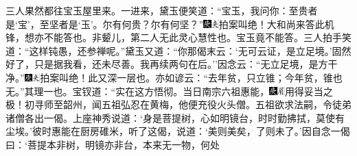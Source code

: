 三人果然都往宝玉屋里来。一进来，黛玉便笑道：``宝玉，我问你：至贵者是`宝'，至坚者是`玉'。尔有何贵？尔有何坚？''{\includegraphics[width=3mm]{../Images/00004}\includegraphics[width=3mm]{../Images/00012}\footnotesize \kaishu 拍案叫绝！大和尚来答此机锋，想亦不能答也。非颦儿，第二人无此灵心慧性也。}宝玉竟不能答。三人拍手笑道：``这样钝愚，还参禅呢。''黛玉又道：``你那偈末云：`无可云证，是立足境。'固然好了，只是据我看，还未尽善。我再续两句在后。''因念云：``无立足境，是方干净。''{\includegraphics[width=3mm]{../Images/00004}\includegraphics[width=3mm]{../Images/00012}\footnotesize \kaishu 拍案叫绝！此又深一层也。亦如谚云：``去年贫，只立锥；今年贫，锥也无。''其理一也。}宝钗道：``实在这方悟彻。当日南宗六祖惠能，{\includegraphics[width=3mm]{../Images/00004}\includegraphics[width=3mm]{../Images/00010}\footnotesize \kaishu 用得妥当之极！}初寻师至韶州，闻五祖弘忍在黄梅，他便充役火头僧。五祖欲求法嗣，令徒弟诸僧各出一偈。上座神秀说道：`身是菩提树，心如明镜台，时时勤拂拭，莫使有尘埃。'彼时惠能在厨房碓米，听了这偈，说道：`美则美矣，了则未了。'因自念一偈曰：`菩提本非树，明镜亦非台，本来无一物，何处